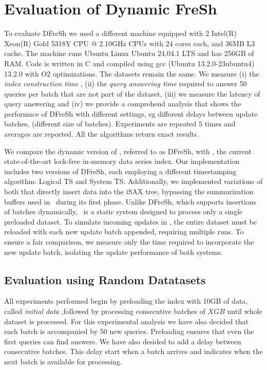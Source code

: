 \clearpage

\section{Evaluation of Dynamic FreSh}

To evaluate DFreSh we used a different machine equipped with 
2 Intel(R) Xeon(R) Gold 5318Y CPU @ 2.10GHz
CPUs with 24 cores each, and 36MB L3 cache. The machine runs
Ubuntu Linux Ubuntu 24.04.1 LTS and has 256GB of RAM. Code is written in 
C and compiled using gcc (Ubuntu 13.2.0-23ubuntu4) 13.2.0 with O2 optimizations.
 The datasets remain the same.
We measure (i) the {\em index construction time} , 
(ii) the {\em query answering time} required to answer 50 queries per batch that are not
part of the dataset, 
(iii) we measure the latency of query answering and 
(iv) we provide a comprehend analysis that shows the performace of DFreSh with 
different settings, eg different delays between update batches, (different size of batches). 
Experiments are repeated $5$ times and averages are reported. All the algorithms
return exact results.

We compare the dynamic version of \Fresh, referred to as DFreSh, with \Fresh, 
the current state-of-the-art lock-free in-memory data series index. Our implementation 
includes two versions of DFreSh, each employing a different timestamping algorithm: 
Logical TS and System TS. Additionally, we implemented variations of both that directly 
insert data into the iSAX tree, bypassing the summarization buffers used in 
\Fresh\ during its first phase.
Unlike DFreSh, which supports insertions of batches dynamically, \Fresh\ is a static
system designed to process only a single preloaded dataset. To simulate incoming updates
in \Fresh, the entire dataset must be reloaded with each new update batch appended, requiring 
multiple runs. To ensure a fair comparison, we measure only the time required to 
incorporate the new update batch, isolating the update performance of both systems.

\subsection{Evaluation using Random Datatasets}
All experiments performed begin by preloading the index with 10GB of data, called
\textit{initial data} ,followed by processing consecutive batches of $XGB$ until 
whole dataset is processed. For this experimental analysis we have also decided
that each batch is accompanied by 50 new queries. Preloading ensures that even the first 
queries can find answers. We have also desided to add a delay between consecutive batches.
This delay start when a batch arrives and indicates when the next batch is available for
processing.

